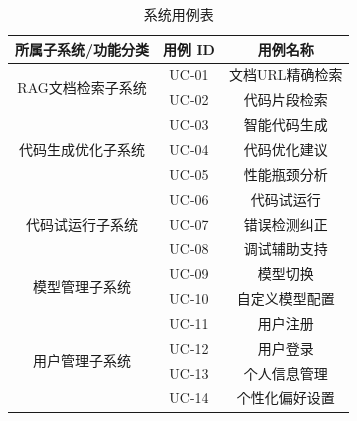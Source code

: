 \documentclass[
    report,     %
    oneside,    %
    UTF8,       %
    zihao=-4    %
]{config} %
\begin{document}
\begin{table}[H] %
    \centering %
    \caption{系统用例表} %
    \label{tab:system-use-case} %
    \renewcommand\arraystretch{0.85} %
    \setlength{\tabcolsep}{12pt} %
    \begin{tabular}{ccc} %
        \toprule[1.5pt] %
        \textbf{所属子系统/功能分类} & \textbf{用例 ID} & \textbf{用例名称} \\ %
        \midrule[0.8pt] %
        \multirow{2}{*}{RAG文档检索子系统} & UC-01 & 文档URL精确检索 \\
        & UC-02 & 代码片段检索 \\
        \midrule[0.5pt]
        \multirow{3}{*}{代码生成优化子系统} & UC-03 & 智能代码生成 \\
        & UC-04 & 代码优化建议 \\
        & UC-05 & 性能瓶颈分析 \\
        \midrule[0.5pt]
        \multirow{3}{*}{代码试运行子系统} & UC-06 & 代码试运行 \\
        & UC-07 & 错误检测纠正 \\
        & UC-08 & 调试辅助支持 \\
        \midrule[0.5pt]
        \multirow{2}{*}{模型管理子系统} & UC-09 & 模型切换 \\
        & UC-10 & 自定义模型配置 \\
        \midrule[0.5pt]
        \multirow{4}{*}{用户管理子系统} & UC-11 & 用户注册 \\
        & UC-12 & 用户登录 \\
        & UC-13 & 个人信息管理 \\
        & UC-14 & 个性化偏好设置 \\
        \hline\hline %
    \end{tabular}
\end{table}
\end{document}
